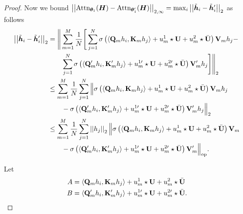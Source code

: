 \begin{proof}
    Now we bound 
    $
    \left\lvert \left\lvert
    \text{Attn}_{\bm{\theta}_1}( \bm{H} )
    -
    \text{Attn}_{\bm{\theta}_1^\prime}(\bm{H})
    \right\rvert \right\rvert_{2, \infty}
    =
    \max_i 
    \left\lvert \left\lvert \tilde{\bm{h}}_i - \tilde{\bm{h}}_i^\prime \right\rvert \right\rvert_2 
    $ as follows
    \begin{align*}
        \left\lvert \left\lvert \tilde{\bm{h}}_i - \tilde{\bm{h}}_i^\prime \right\rvert \right\rvert_2 
        &=
        \Bigg\Vert
        \sum_{m=1}^M
        \frac{1}{N}
        \Bigg[
        \sum_{j=1}^N
        \sigma
        \left(
        \Braket{ \mathbf{Q}_m h_i, \mathbf{K}_m h_j }
        +
        u^1_m
        \star 
        \mathbf{U}
        +
        u^2_m
        \star
        \bar{\mathbf{U}}
        \right)
        \mathbf{V}_m h_j
        -
        \\
        &\quad\quad
        \sum_{j=1}^N
        \sigma
        \left(
        \Braket{ \mathbf{Q}_m^\prime h_i, \mathbf{K}_m^\prime h_j }
        +
        u_m^{1\prime}
        \star 
        \mathbf{U}
        +
        u_m^{2 \prime}
        \star
        \bar{\mathbf{U}}
        \right)
        \mathbf{V}_m^\prime h_j
        \Bigg]
        \Bigg\Vert_2
        \\
        &\leq
        \sum_{m=1}^M
        \frac{1}{N}
        \sum_{j=1}^N
        \Big\Vert
        \sigma
        \left(
        \Braket{ \mathbf{Q}_m h_i, \mathbf{K}_m h_j }
        +
        u^1_m
        \star 
        \mathbf{U}
        +
        u^2_m
        \star
        \bar{\mathbf{U}}
        \right)
        \mathbf{V}_m h_j 
        \\
        &\quad\quad
        -
        \sigma
        \left(
        \Braket{ \mathbf{Q}_m^\prime h_i, \mathbf{K}_m^\prime h_j }
        +
        u_m^{1\prime}
        \star 
        \mathbf{U}
        +
        u_m^{2 \prime}
        \star
        \bar{\mathbf{U}}
        \right)
        \mathbf{V}_m^\prime h_j
        \Big\Vert_2
        \\
        &\leq
        \sum_{m=1}^M
        \frac{1}{N}
        \sum_{j=1}^N
        \left\lvert \left\lvert h_j\right\rvert \right\rvert_2
        \Big\Vert
        \sigma
        \left(
        \Braket{ \mathbf{Q}_m h_i, \mathbf{K}_m h_j }
        +
        u_m^1
        \star 
        \mathbf{U}
        +
        u_m^2
        \star
        \bar{\mathbf{U}}
        \right)
        \mathbf{V}_m
        \\
        &\quad\quad
        -
        \sigma
        \left(
        \Braket{ \mathbf{Q}_m^\prime h_i, \mathbf{K}_m^\prime h_j }
        +
        u_m^{1\prime}
        \star 
        \mathbf{U}
        +
        u_m^{2 \prime}
        \star
        \bar{\mathbf{U}}
        \right)
        \mathbf{V}_m^\prime
        \Big\Vert_{\text{op}}.
    \end{align*}


    Let 
    \begin{align*}
        A &= 
        \Braket{ \mathbf{Q}_m h_i, \mathbf{K}_m h_j }
        +
        u^1_m
        \star 
        \mathbf{U}
        +
        u_m^2
        \star
        \bar{\mathbf{U}}
        \\
        B &= 
        \Braket{ \mathbf{Q}_m^\prime h_i, \mathbf{K}_m^\prime h_j }
        +
        u_m^{1\prime}
        \star 
        \mathbf{U}
        +
        u_m^{2 \prime}
        \star
        \bar{\mathbf{U}}.
    \end{align*}


\end{proof}
